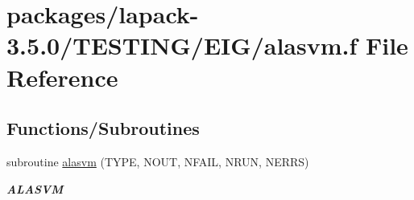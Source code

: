 \hypertarget{EIG_2alasvm_8f}{}\section{packages/lapack-\/3.5.0/\+T\+E\+S\+T\+I\+N\+G/\+E\+I\+G/alasvm.f File Reference}
\label{EIG_2alasvm_8f}
\subsection*{Functions/\+Subroutines}
\begin{DoxyCompactItemize}
\item 
subroutine \hyperlink{group__aux__eig_gad0cdc70e35bb8b07b0e95688e8d2123f}{alasvm} (T\+Y\+P\+E, N\+O\+U\+T, N\+F\+A\+I\+L, N\+R\+U\+N, N\+E\+R\+R\+S)
\begin{DoxyCompactList}\small\item\em {\bfseries A\+L\+A\+S\+V\+M} \end{DoxyCompactList}\end{DoxyCompactItemize}
